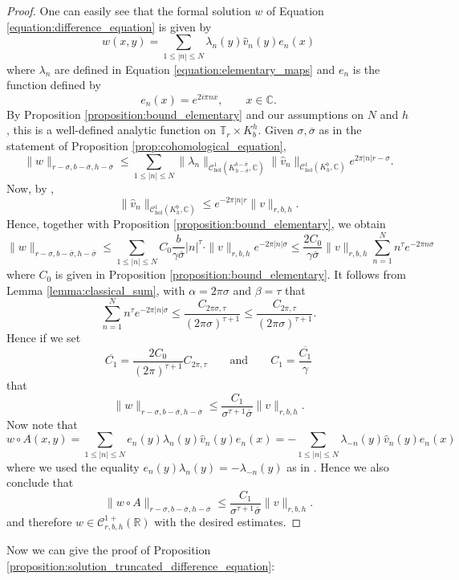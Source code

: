 \documentclass[10pt]{article}
\newcommand{\C}{\mathbb{C}}
\newcommand{\T}{\mathbb{T}}
\newcommand{\RR}{\mathbb{R}}
\newcommand{\CC}{\mathbb{C}}
\begin{document}
\begin{proof}
One can easily see that the formal solution $w$ of Equation \eqref{equation:difference_equation} is given by
\[
w(x,y) = \sum_{1\leq |n|\leq N}\lambda_n(y)\widehat v_n(y)e_n(x)
\]
where $\lambda_n$ are defined in Equation \eqref{equation:elementary_maps} and $e_n$ is the function defined by
\[
e_n(x) = e^{2i\pi nx},
\qquad x\in\C.
\]
By Proposition \ref{proposition:bound_elementary} and our assumptions on $N$ and $h$, this is a well-defined analytic function on $\T_{r}\times K_{b}^h$. Given $\sigma,\overline\sigma$ as in the statement of Proposition \ref{prop:cohomological_equation},
\[
\|w\|_{r-\sigma,b-\overline\sigma,h-\overline\sigma}
\leq 
\sum_{1\leq |n|\leq N}
\|\lambda_n\|_{\mathscr C^1_{\text{hol}}(K_{h-\overline\sigma}^{b-\overline\sigma}, \CC)}
\|\hat v_n\|_{\mathscr C^1_{\text{hol}}(K_{h}^{b}, \CC)}e^{2\pi|n|r-\sigma}.
\]
Now, by \cite[Corollary 10]{CMS},
\[
\|\widehat v_n\|_{\mathscr C^1_{\text{hol}}(K^b_h,\CC)} 
\leq e^{-2\pi |n|r}\|v\|_{r,b,h}.
\]
Hence, together with Proposition \ref{proposition:bound_elementary}, we obtain 
\[
\|w\|_{r-\sigma,b-\overline\sigma,h-\overline\sigma}
\leq 
\sum_{1\leq |n|\leq N}
C_0\frac{b}{\gamma\overline\sigma}|n|^{\tau}
\cdot
\|v\|_{r,b,h}e^{-2\pi |n|\sigma}
\leq
\frac{2C_0}{\gamma\overline\sigma}\|v\|_{r,b,h}\sum_{n=1}^N n^{\tau} e^{-2\pi n\sigma}
\]
where $C_0$ is given in Proposition \ref{proposition:bound_elementary}.
It follows from Lemma \ref{lemma:classical_sum}, with $\alpha = 2\pi\sigma$ and $\beta = \tau$ 
that
\[
\sum_{n=1}^N n^{\tau} e^{-2\pi|n|\sigma}
\leq 
\frac{C_{2\pi\sigma,\tau}}{(2\pi\sigma)^{\tau+1}} 
\leq 
\frac{C_{2\pi,\tau}}{(2\pi\sigma)^{\tau+1}}.
\]
Hence if we set
\[
\overline{C_1} = \frac{2C_0}{(2\pi)^{\tau+1}}C_{2\pi,\tau}
\qquad
\text{and}
\qquad
C_1 = \frac{\overline{C_1}}{\gamma}
\]
that 
\[
\|w\|_{r-\sigma,b-\overline\sigma,h-\overline\sigma}
\leq 
\frac{C_1}{\sigma^{\tau+1}{\overline \sigma}}\|v\|_{r,b,h}.
\]
Now note that 
\[
w\circ A(x,y) = \sum_{1\leq |n|\leq N}e_n(y)\lambda_n(y)\widehat v_n(y)e_n(x) = -\sum_{1\leq |n|\leq N}\lambda_{-n}(y)\widehat v_n(y)e_n(x)
\]
where we used the equality $e_n(y)\lambda_n(y) = -\lambda_{-n}(y)$ as in \cite{CMS}. Hence we also conclude that
\[
\|w\circ A\|_{r-\sigma,b-\overline\sigma,h-\overline\sigma}
\leq 
\frac{C_1}{\sigma^{\tau+1}{\overline \sigma}}\|v\|_{r,b,h}.
\]
and therefore $w\in\mathscr C^{1+}_{r,b,h}(\RR)$ with the desired estimates.
\end{proof}

Now we can give the proof of Proposition \ref{proposition:solution_truncated_difference_equation}:
\end{document}
